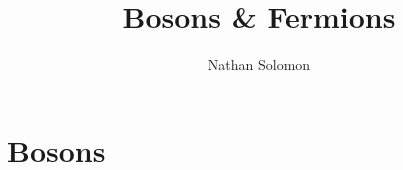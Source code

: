 \documentclass[12pt]{article}
\begin{document}
\title{Bosons \& Fermions}
\author{Nathan Solomon}
\maketitle

\section{Bosons}
\end{document}
